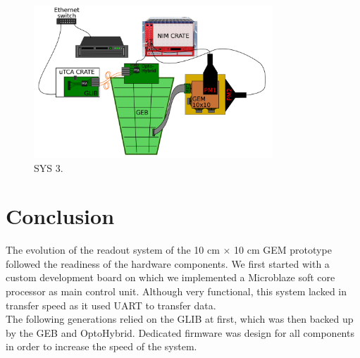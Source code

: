     \begin{figure}[h!]
      \centering
      \includegraphics[width=0.8\textwidth]{img/III-1-arch/sys_3.png}
      \caption{SYS 3.}
      \label{fig:III-1-sys-3}
    \end{figure}

  \section{Conclusion}

    The evolution of the readout system of the 10 cm $ \times $ 10 cm GEM prototype followed the readiness of the hardware components. We first started with a custom development board on which we implemented a Microblaze soft core processor as main control unit. Although very functional, this system lacked in transfer speed as it used UART to transfer data. \\

    The following generations relied on the GLIB at first, which was then backed up by the GEB and OptoHybrid. Dedicated firmware was design for all components in order to increase the speed of the system.
